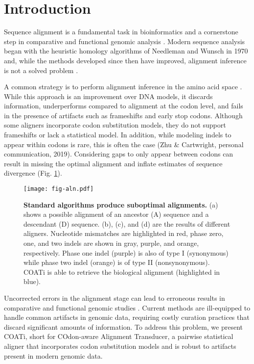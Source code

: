 \section*{Introduction}

Sequence alignment is a fundamental task in bioinformatics and a cornerstone step in comparative and functional genomic analysis \parencite{sequence_alignment_rosenberg_2009}.
Modern sequence analysis began with the heuristic homology algorithms of Needleman and Wunsch in 1970 \parencite{identification_smith_1981} and, while the methods developed since then have improved, alignment inference is not a solved problem \parencite{art_morrison_2015}.

A common strategy is to perform alignment inference in the amino acid space \parencite{bininda2005transalign,abascal2010translatorx}.
While this approach is an improvement over DNA models, it discards information, underperforms compared to alignment at the codon level, and fails in the presence of artifacts such as frameshifts and early stop codons.
Although some aligners incorporate codon substitution models, they do not support frameshifts or lack a statistical model.
In addition, while modeling indels to appear within codons is rare, this is often the case (Zhu \& Cartwright, personal communication, 2019).
Considering gaps to only appear between codons can result in missing the optimal alignment and inflate estimates of sequence divergence (Fig. \ref{fig:aln}).

\begin{figure}[h!]
    \begin{minipage}[c]{0.65\textwidth}
        \texttt{[image: fig-aln.pdf]}
    \end{minipage}\hfill
    \begin{minipage}[c]{0.35\textwidth}
        \caption{
        \textbf{Standard algorithms produce suboptimal alignments.}
        (a) shows a possible alignment of an ancestor (A) sequence and a descendant (D) sequence.
        (b), (c), and (d) are the results of different aligners.
        Nucleotide mismatches are highlighted in red, phase zero, one, and two indels are shown in gray, purple, and orange, respectively.
        Phase one indel (purple) is also of type I (synonymous) while phase two indel (orange) is of type II (nonsynonymous). 
        COATi is able to retrieve the biological alignment (highlighted in blue).
        }
    \label{fig:aln}
    \end{minipage}
\end{figure}

Uncorrected errors in the alignment stage can lead to erroneous results in comparative and functional genomic studies \parencite{estimates_schneider_2009}.
Current methods are ill-equipped to handle common artifacts in genomic data, requiring costly curation practices that discard significant amounts of information.
To address this problem, we present COATi, short for COdon-aware Alignment Transducer, a pairwise statistical aligner that incorporates codon substitution models and is robust to artifacts present in modern genomic data.

